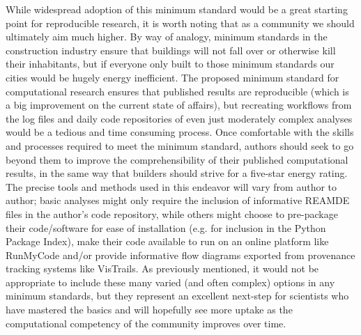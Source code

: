 While widespread adoption of this minimum standard would be a great starting point for reproducible research, it is worth noting that as a community we should ultimately aim much higher. By way of analogy, minimum standards in the construction industry ensure that buildings will not fall over or otherwise kill their inhabitants, but if everyone only built to those minimum standards our cities would be hugely energy inefficient. The proposed minimum standard for computational research ensures that published results are reproducible (which is a big improvement on the current state of affairs), but recreating workflows from the log files and daily code repositories of even just moderately complex analyses \citep[e.g.][]{Irving2015} would be a tedious and time consuming process. Once comfortable with the skills and processes required to meet the minimum standard, authors should seek to go beyond them to improve the comprehensibility of their published computational results, in the same way that builders should strive for a five-star energy rating. The precise tools and methods used in this endeavor will vary from author to author; basic analyses might only require the inclusion of informative REAMDE files in the author's code repository, while others might choose to pre-package their code/software for ease of installation (e.g. for inclusion in the Python Package Index), make their code available to run on an online platform like RunMyCode \citep{Stodden2012} and/or provide informative flow diagrams exported from provenance tracking systems like VisTrails. As previously mentioned, it would not be appropriate to include these many varied (and often complex) options in any minimum standards, but they represent an excellent next-step for scientists who have mastered the basics and will hopefully see more uptake as the computational competency of the community improves over time.

